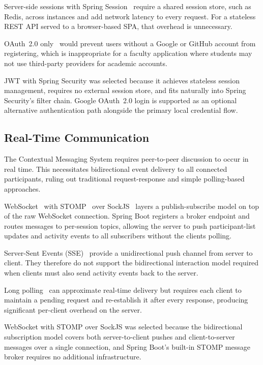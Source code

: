 Server-side sessions with Spring Session~\cite{SpringSession} require a shared session store, such as Redis, across instances and add network latency to every request. For a stateless REST API served to a browser-based SPA, that overhead is unnecessary.

OAuth~2.0 only~\cite{OAuth2} would prevent users without a Google or GitHub account from registering, which is inappropriate for a faculty application where students may not use third-party providers for academic accounts.

JWT with Spring Security was selected because it achieves stateless session management, requires no external session store, and fits naturally into Spring Security's filter chain. Google OAuth~2.0 login is supported as an optional alternative authentication path alongside the primary local credential flow.

\subsection{Real-Time Communication}
\label{subsec:websocket-tech}

The Contextual Messaging System requires peer-to-peer discussion to occur in real time. This necessitates bidirectional event delivery to all connected participants, ruling out traditional request-response and simple polling-based approaches.

WebSocket~\cite{WebSocketRFC6455} with STOMP~\cite{STOMP} over SockJS~\cite{SockJS} layers a publish-subscribe model on top of the raw WebSocket connection. Spring Boot registers a broker endpoint and routes messages to per-session topics, allowing the server to push participant-list updates and activity events to all subscribers without the clients polling.

Server-Sent Events (SSE)~\cite{SSE} provide a unidirectional push channel from server to client. They therefore do not support the bidirectional interaction model required when clients must also send activity events back to the server.

Long polling~\cite{LongPollingRFC6202} can approximate real-time delivery but requires each client to maintain a pending request and re-establish it after every response, producing significant per-client overhead on the server.

WebSocket with STOMP over SockJS was selected because the bidirectional subscription model covers both server-to-client pushes and client-to-server messages over a single connection, and Spring Boot's built-in STOMP message broker requires no additional infrastructure.

